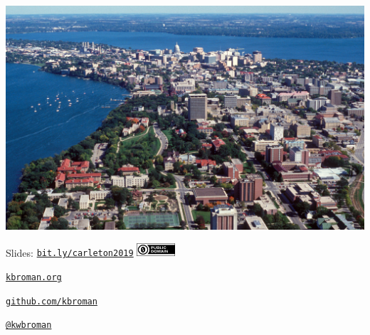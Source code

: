 \documentclass[12pt,t,aspectratio=169]{beamer}
\begin{document}
\begin{frame}[c]{}

  \vspace{-10mm} \hspace*{-13mm}
  \includegraphics[height=1.2\textheight]{Pics/madison.jpg}

\end{frame}



\begin{frame}[c]{}

\Large

Slides: \href{https://bit.ly/carleton2019}{\tt bit.ly/carleton2019} \quad
\includegraphics[height=5mm]{Figs/cc-zero.png}

\vspace{7mm}

\href{https://kbroman.org}{\tt \lolit kbroman.org}

\vspace{7mm}

\href{https://github.com/kbroman}{\tt \lolit github.com/kbroman}

\vspace{7mm}

\href{https://twitter.com/kwbroman}{\tt \lolit @kwbroman}


\end{frame}
\end{document}
